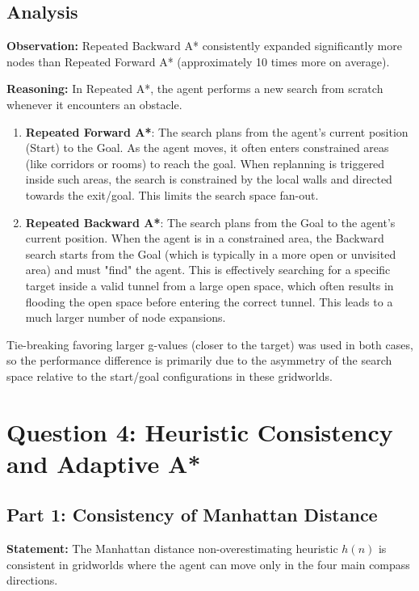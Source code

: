 \documentclass{article}
\begin{document}
\subsection*{Analysis}
\textbf{Observation:} Repeated Backward A* consistently expanded significantly more nodes than Repeated Forward A* (approximately 10 times more on average). 

\textbf{Reasoning:}
In Repeated A*, the agent performs a new search from scratch whenever it encounters an obstacle. 
\begin{enumerate}
    \item \textbf{Repeated Forward A*}: The search plans from the agent's current position (Start) to the Goal. As the agent moves, it often enters constrained areas (like corridors or rooms) to reach the goal. When replanning is triggered inside such areas, the search is constrained by the local walls and directed towards the exit/goal. This limits the search space fan-out.
    \item \textbf{Repeated Backward A*}: The search plans from the Goal to the agent's current position. When the agent is in a constrained area, the Backward search starts from the Goal (which is typically in a more open or unvisited area) and must "find" the agent. This is effectively searching for a specific target inside a valid tunnel from a large open space, which often results in flooding the open space before entering the correct tunnel. This leads to a much larger number of node expansions.
\end{enumerate}
Tie-breaking favoring larger g-values (closer to the target) was used in both cases, so the performance difference is primarily due to the asymmetry of the search space relative to the start/goal configurations in these gridworlds.

\section*{Question 4: Heuristic Consistency and Adaptive A*}

\subsection*{Part 1: Consistency of Manhattan Distance}
\textbf{Statement:} The Manhattan distance non-overestimating heuristic $h(n)$ is consistent in gridworlds where the agent can move only in the four main compass directions.
\end{document}
